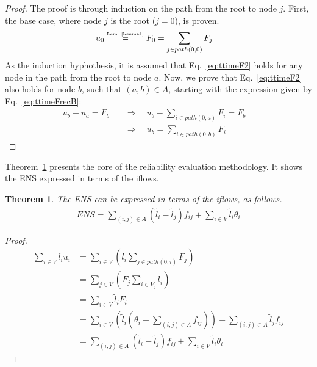 \documentclass{article}
\newtheorem{theorem}{Theorem}
\begin{document}
\begin{proof}
	The proof is through induction on the path from the root to node $j$. First, the base case, where node $j$ is the root ($j=0$), is proven.
 	\begin{align}
 	    u_0 &\stackrel{\mbox{\tiny Lem.~\ref{lemma1}}}{=} F_0 = \sum_{j \in path(0,0)}{F_j} \nonumber
	\end{align}
	As the induction hyphothesis, it is assumed that Eq.~\eqref{eq:ttimeF2} holds for any node in the path from the root to node $a$. Now, we prove that Eq.~\eqref{eq:ttimeF2} also holds for node $b$, such that $(a,b) \in A$, starting with the expression given by Eq.~\eqref{eq:ttimeFrecB}:
 	\begin{align}
     	\displaystyle
 	    u_b - u_a = F_b \quad &\Rightarrow \quad u_b - \sum_{i \in path(0,a)}{F_i} = F_b \nonumber \quad \nonumber \\ &\Rightarrow \quad u_b = \sum_{i \in path(0,b)}{F_i} \nonumber
	\end{align}
\end{proof}

Theorem~\ref{theo1} presents the core of the reliability evaluation methodology. It shows the ENS expressed in terms of the iflows. 

\begin{theorem} \label{theo1}
The ENS can be expressed in terms of the iflows, as follows.
 	\begin{align} \label{eq:ENS2}
		\displaystyle ENS = \sum_{(i,j) \in A}{(\tilde{l}_i-\tilde{l}_j)f_{ij}} + \sum_{i \in V}{\tilde{l}_i\theta_{i}}
	\end{align}
\end{theorem}
\begin{proof}
	\begin{subequations} 
	\begin{align}
        \displaystyle \sum_{i \in V}{l_iu_i} &= \sum_{i \in V}{\left( l_i\sum_{j \in path(0,i)}{F_j} \right)} \label{eq:ens_a}  \\
		&= \sum_{j \in V}{\left( F_j\sum_{i \in V_j}{l_i} \right)} \label{eq:ens_b} \\
		&= \sum_{i \in V}{\tilde{l}_iF_i} \label{eq:ens_c} \\
		&= \sum_{i \in V}{\left( \tilde{l}_i\left(\theta_i + \sum_{(i,j) \in A}{f_{ij}} \right) \right)} - \sum_{(i,j) \in A}{\tilde{l}_jf_{ij}} \label{eq:ens_d}	 \\
		&= \sum_{(i,j) \in A}{(\tilde{l}_i-\tilde{l}_j)f_{ij}} + \sum_{i \in V}{\tilde{l}_i\theta_{i}} \label{eq:ens_e}
	\end{align}
	\end{subequations}
\end{proof}
\end{document}
